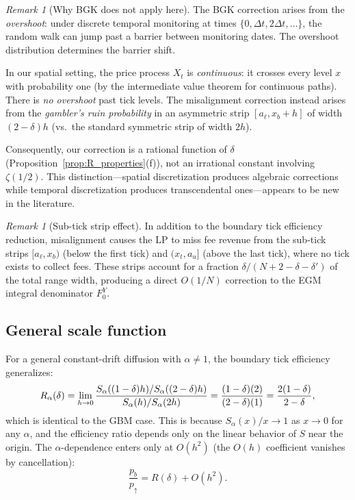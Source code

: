 \documentclass[11pt]{article}
\theoremstyle{definition}
\theoremstyle{remark}
\newtheorem{remark}[theorem]{Remark}
\begin{document}
\begin{remark}[Why BGK does not apply here]\label{rem:bgk}
The BGK correction arises from the \emph{overshoot}: under discrete
temporal monitoring at times $\{0, \Delta t, 2\Delta t, \ldots\}$,
the random walk can jump past a barrier between monitoring dates.
The overshoot distribution determines the barrier shift.

In our spatial setting, the price process $X_t$ is
\emph{continuous}: it crosses every level $x$ with probability one
(by the intermediate value theorem for continuous paths). There is
\emph{no overshoot} past tick levels. The misalignment correction
instead arises from the \emph{gambler's ruin probability} in an
asymmetric strip $[a_\ell, x_b + h]$ of width $(2-\delta)h$ (vs.\
the standard symmetric strip of width $2h$).

Consequently, our correction is a rational function of $\delta$
(Proposition~\ref{prop:R_properties}(f)), not an irrational constant
involving $\zeta(1/2)$. This distinction---spatial discretization
produces algebraic corrections while temporal discretization produces
transcendental ones---appears to be new in the literature.
\end{remark}

\begin{remark}[Sub-tick strip effect]
In addition to the boundary tick efficiency reduction, misalignment
causes the LP to miss fee revenue from the sub-tick strips
$[a_\ell, x_b)$ (below the first tick) and $(x_t, a_u]$ (above the
last tick), where no tick exists to collect fees. These strips account
for a fraction $\delta/(N + 2 - \delta - \delta')$ of the total range
width, producing a direct $O(1/N)$ correction to the EGM integral
denominator $F_0^Y$.
\end{remark}

\subsection{General scale function}

For a general constant-drift diffusion with $\alpha \ne 1$, the
boundary tick efficiency generalizes:
\begin{equation}\label{eq:R_general}
R_\alpha(\delta) = \lim_{h \to 0}
\frac{S_\alpha((1-\delta)h)/S_\alpha((2-\delta)h)}{%
S_\alpha(h)/S_\alpha(2h)}
= \frac{(1-\delta)(2)}{(2-\delta)(1)}
= \frac{2(1-\delta)}{2-\delta},
\end{equation}
which is identical to the GBM case. This is because
$S_\alpha(x)/x \to 1$ as $x \to 0$ for any $\alpha$, and the
efficiency ratio depends only on the linear behavior of $S$ near the
origin. The $\alpha$-dependence enters only at $O(h^2)$ (the $O(h)$ coefficient vanishes by cancellation):
\begin{equation}\label{eq:R_alpha_correction}
\frac{p_b}{p_\uparrow}
= R(\delta) + O(h^2).
\end{equation}
\end{document}
